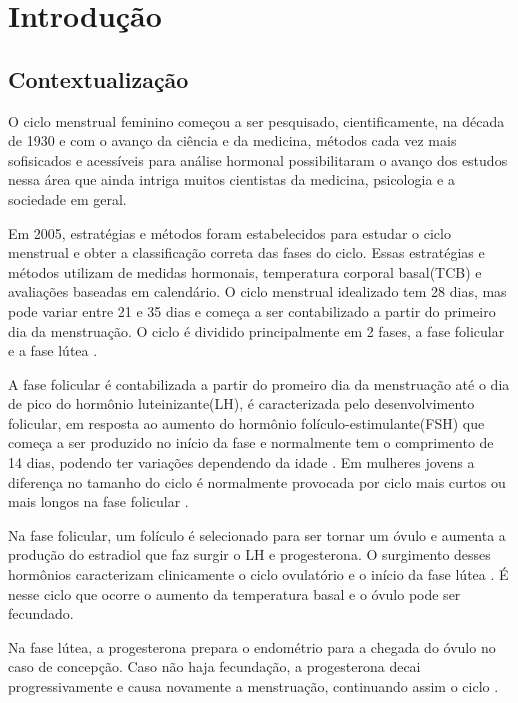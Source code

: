 \chapter[Introdução]{Introdução}

\section{Contextualização}

O ciclo menstrual feminino começou a ser pesquisado, cientificamente, na década de 1930 \cite{frank1931} e com o avanço da ciência e da medicina, métodos cada vez mais sofisicados e acessíveis para análise hormonal possibilitaram o avanço dos estudos nessa área que ainda intriga muitos cientistas da medicina, psicologia e a sociedade em geral.

Em 2005, estratégias e métodos foram estabelecidos para estudar o ciclo menstrual e obter a classificação correta das fases do ciclo\cite{becker2005}. Essas estratégias e métodos utilizam de medidas hormonais, temperatura corporal basal(TCB) e avaliações baseadas em calendário. O ciclo menstrual idealizado tem 28 dias, mas pode variar entre 21 e 35 dias \cite{lenton1984a} e começa a ser contabilizado a partir do primeiro dia da menstruação. O ciclo é dividido principalmente em 2 fases, a fase folicular e a fase lútea \cite{brondin2008}.

A fase folicular é contabilizada a partir do promeiro dia da menstruação até o dia de pico do hormônio luteinizante(LH), é caracterizada pelo desenvolvimento folicular, em resposta ao aumento do hormônio folículo-estimulante(FSH) que começa a ser produzido no início da fase e normalmente tem o comprimento de 14 dias, podendo ter variações dependendo da idade \cite{lenton1984a}. Em mulheres jovens a diferença no tamanho do ciclo é normalmente provocada por ciclo mais curtos ou mais longos na fase folicular \cite{lenton1984a}.

Na fase folicular, um folículo é selecionado para ser tornar um óvulo e aumenta a produção do estradiol que faz surgir o LH e progesterona. O surgimento desses hormônios caracterizam clinicamente o ciclo ovulatório e o início da fase lútea \cite{fritz2010}. É nesse ciclo que ocorre o aumento da temperatura basal e o óvulo pode ser fecundado. 

Na fase lútea, a progesterona prepara o endométrio para a chegada do óvulo no caso de concepção. Caso não haja fecundação, a progesterona decai progressivamente e causa novamente a menstruação, continuando assim o ciclo \cite{nikas2003}.

